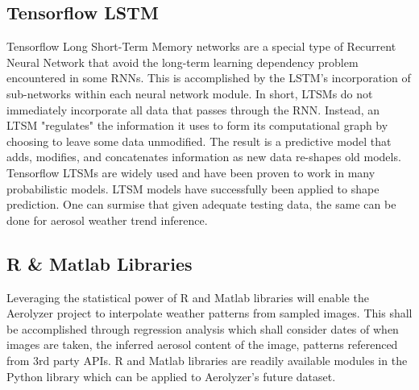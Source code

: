 \documentclass[onecolumn, draftclsnofoot,10pt, compsoc]{IEEEtran}
\begin{document}
\begin{singlespace}
	\subsection{Tensorflow LSTM}
		Tensorflow Long Short-Term Memory networks are a special type of Recurrent Neural Network that avoid the long-term learning dependency problem encountered in some RNNs.
		This is accomplished by the LSTM’s incorporation of sub-networks within each neural network module.
		In short, LTSMs do not immediately incorporate all data that passes through the RNN.
		Instead, an LTSM "regulates" the information it uses to form its computational graph by choosing to leave some data unmodified.
		The result is a predictive model that adds, modifies, and concatenates information as new data re-shapes old models.
		Tensorflow LTSMs are widely used and have been proven to work in many probabilistic models.
		LTSM models have successfully been applied to shape prediction.
		One can surmise that given adequate testing data, the same can be done for aerosol weather trend inference. \cite{LSTM} \cite{LSTM_REG}

	\subsection{R \& Matlab Libraries}
		Leveraging the statistical power of R and Matlab libraries will enable the Aerolyzer project to interpolate weather patterns from sampled images.
		This shall be accomplished through regression analysis which shall consider dates of when images are taken, the inferred aerosol content of the image, patterns referenced from 3rd party APIs.
		R and Matlab libraries are readily available modules in the Python library which can be applied to Aerolyzer’s future dataset. \cite{R} \cite{matlab}


\end{singlespace}
\end{document}
